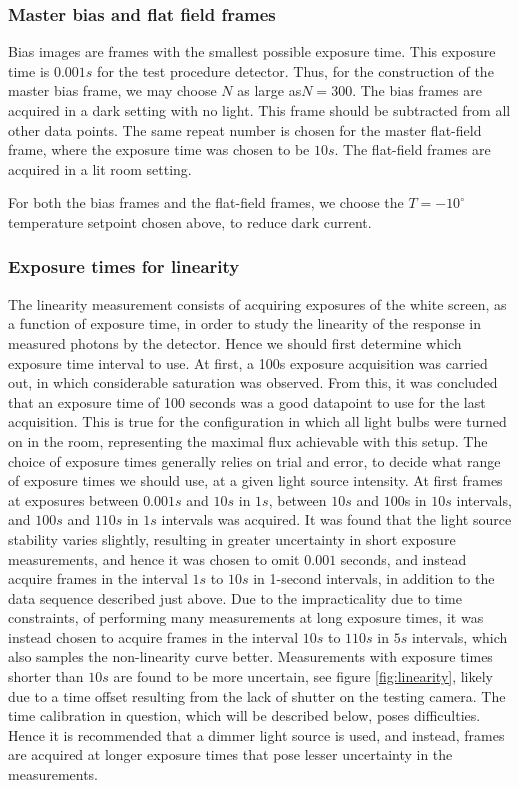 \documentclass[../main.tex]{subfiles}
\begin{document}
		\subsubsection{Master bias and flat field frames}
		Bias images are frames with the smallest possible exposure time. This exposure time is $0.001s$ for the test procedure detector. Thus, for the construction of the master bias frame, we may choose $N$ as large as$N = 300$.  The bias frames are acquired in a dark setting with no light. This frame should be subtracted from all other data points. The same repeat number is chosen for the master flat-field frame, where the exposure time was chosen to be $10s$.  The flat-field frames are acquired in a lit room setting. 
		
		For both the bias frames and the flat-field frames, we choose the $T= -10^\circ$ temperature setpoint chosen above, to reduce dark current.
		
		\subsubsection{Exposure times for linearity}\label{sec:explin}
		The linearity measurement consists of acquiring exposures of the white screen, as a function of exposure time, in order to study the linearity of the response in measured photons by the detector. Hence we should first determine which exposure time interval to use. At first, a 100s exposure acquisition was carried out, in which considerable saturation was observed. From this, it was concluded that an exposure time of 100 seconds was a good datapoint to use for the last acquisition. This is true for the configuration in which all light bulbs were turned on in the room, representing the maximal flux achievable with this setup. The choice of exposure times generally relies on trial and error, to decide what range of exposure times we should use, at a given light source intensity. At first frames at exposures between $0.001s$ and $10s$ in $1s$, between $10s$ and $100$s in $10s$ intervals, and $100s$ and $110s$ in $1s$ intervals was acquired. It was found that the light source stability varies slightly, resulting in greater uncertainty in short exposure measurements, and hence it was chosen to omit $0.001$ seconds, and instead acquire frames in the interval $1s$ to $10s$ in 1-second intervals, in addition to the data sequence described just above. Due to the impracticality due to time constraints, of performing many measurements at long exposure times, it was instead chosen to acquire frames in the interval $10s$ to $110s$ in $5s$ intervals, which also samples the non-linearity curve better. Measurements with exposure times shorter than $10s$ are found to be more uncertain, see figure \ref{fig:linearity}, likely due to a time offset resulting from the lack of shutter on the testing camera. The time calibration in question, which will be described below, poses difficulties. Hence it is recommended that a dimmer light source is used, and instead, frames are acquired at longer exposure times that pose lesser uncertainty in the measurements. 
		
\end{document}
